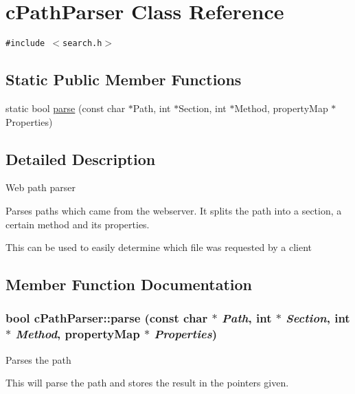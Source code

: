 \hypertarget{classcPathParser}{
\section{cPathParser Class Reference}
\label{classcPathParser}
}
{\tt \#include $<$search.h$>$}

\subsection*{Static Public Member Functions}
\begin{CompactItemize}
\item 
static bool \hyperlink{classcPathParser_83229f6ecd4254d7ed145573eae7967a}{parse} (const char $\ast$Path, int $\ast$Section, int $\ast$Method, propertyMap $\ast$Properties)
\end{CompactItemize}


\subsection{Detailed Description}
Web path parser

Parses paths which came from the webserver. It splits the path into a section, a certain method and its properties.

This can be used to easily determine which file was requested by a client 

\subsection{Member Function Documentation}
\hypertarget{classcPathParser_83229f6ecd4254d7ed145573eae7967a}{
\subsubsection[{parse}]{\setlength{\rightskip}{0pt plus 5cm}bool cPathParser::parse (const char $\ast$ {\em Path}, \/  int $\ast$ {\em Section}, \/  int $\ast$ {\em Method}, \/  propertyMap $\ast$ {\em Properties})}}
\label{classcPathParser_83229f6ecd4254d7ed145573eae7967a}


Parses the path

This will parse the path and stores the result in the pointers given.

